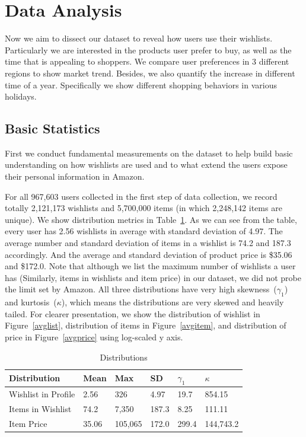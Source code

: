 \section{Data Analysis}

Now we aim to dissect our dataset to reveal how users use their wishlists. Particularly we are interested in the products user prefer to buy, as well as the time that is appealing to shoppers. We compare user preferences in 3 different regions to show market trend. Besides, we also quantify the increase in different time of a year. Specifically we show different shopping behaviors in various holidays.

\subsection{Basic Statistics}
First we conduct fundamental measurements on the dataset to help build basic understanding on how wishlists are used and to what extend the users expose their personal information in Amazon. 

For all 967,603 users collected in the first step of data collection, we record totally 2,121,173 wishlists and 5,700,000 items (in which 2,248,142 items are unique). We show distribution metrics in Table~\ref{tb:stat2}. As we can see from the table, every user has 2.56 wishlists in average with standard deviation of 4.97. The average number and standard deviation of items in a wishlist is 74.2 and 187.3 accordingly. And the average and standard deviation of product price is \$35.06 and \$172.0. Note that although we list the maximum number of wishlists a user has (Similarly, items in wishlists and item price) in our dataset, we did not probe the limit set by Amazon. All three distributions have very high skewness~($\gamma_1$) and kurtosis~($\kappa$), which means the distributions are very skewed and heavily tailed. For clearer presentation, we show the distribution of wishlist in Figure~\ref{avglist}, distribution of items in Figure~\ref{avgitem}, and distribution of price in Figure~\ref{avgprice} using log-scaled y axis.

\begin{table}[t]
\centering
\caption{Distributions}
\label{tb:stat2}
\begin{adjustbox}{max width=.5\textwidth}
\begin{tabular}{llllll}
Distribution & Mean & Max & SD & $\gamma_1$ & $\kappa$ \\ \hline
Wishlist in Profile & 2.56 & 326 & 4.97 & 19.7 & 854.15 \\
Items in Wishlist & 74.2 & 7,350 & 187.3 & 8.25 & 111.11 \\
Item Price & 35.06 & 105,065 & 172.0 & 299.4 & 144,743.2 \\
\end{tabular}
\end{adjustbox}
\end{table}

